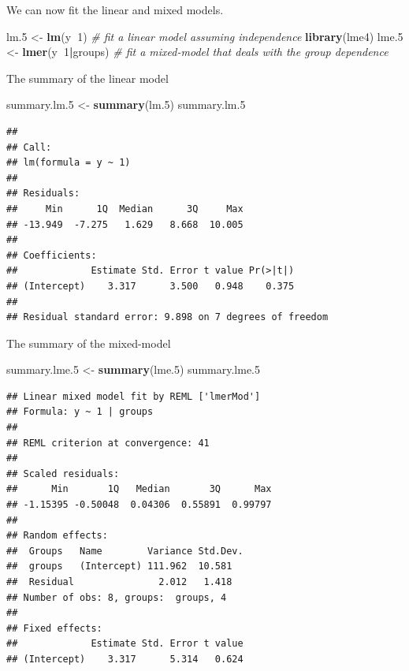 \documentclass[]{book}
\newenvironment{Shaded}{\begin{snugshade}}{\end{snugshade}}
\newcommand{\KeywordTok}[1]{\textcolor[rgb]{0.13,0.29,0.53}{\textbf{#1}}}
\newcommand{\DecValTok}[1]{\textcolor[rgb]{0.00,0.00,0.81}{#1}}
\newcommand{\StringTok}[1]{\textcolor[rgb]{0.31,0.60,0.02}{#1}}
\newcommand{\CommentTok}[1]{\textcolor[rgb]{0.56,0.35,0.01}{\textit{#1}}}
\newcommand{\OperatorTok}[1]{\textcolor[rgb]{0.81,0.36,0.00}{\textbf{#1}}}
\newcommand{\NormalTok}[1]{#1}
\theoremstyle{definition}
\theoremstyle{definition}
\theoremstyle{definition}
\theoremstyle{remark}
\begin{document}
We can now fit the linear and mixed models.

\begin{Shaded}
\begin{Highlighting}[]
\NormalTok{lm.}\DecValTok{5}\NormalTok{ <-}\StringTok{ }\KeywordTok{lm}\NormalTok{(y}\OperatorTok{~}\DecValTok{1}\NormalTok{)  }\CommentTok{# fit a linear model assuming independence}
\KeywordTok{library}\NormalTok{(lme4)}
\NormalTok{lme.}\DecValTok{5}\NormalTok{ <-}\StringTok{ }\KeywordTok{lmer}\NormalTok{(y}\OperatorTok{~}\DecValTok{1}\OperatorTok{|}\NormalTok{groups) }\CommentTok{# fit a mixed-model that deals with the group dependence}
\end{Highlighting}
\end{Shaded}

The summary of the linear model

\begin{Shaded}
\begin{Highlighting}[]
\NormalTok{summary.lm.}\DecValTok{5}\NormalTok{ <-}\StringTok{ }\KeywordTok{summary}\NormalTok{(lm.}\DecValTok{5}\NormalTok{)}
\NormalTok{summary.lm.}\DecValTok{5}
\end{Highlighting}
\end{Shaded}

\begin{verbatim}
## 
## Call:
## lm(formula = y ~ 1)
## 
## Residuals:
##     Min      1Q  Median      3Q     Max 
## -13.949  -7.275   1.629   8.668  10.005 
## 
## Coefficients:
##             Estimate Std. Error t value Pr(>|t|)
## (Intercept)    3.317      3.500   0.948    0.375
## 
## Residual standard error: 9.898 on 7 degrees of freedom
\end{verbatim}

The summary of the mixed-model

\begin{Shaded}
\begin{Highlighting}[]
\NormalTok{summary.lme.}\DecValTok{5}\NormalTok{ <-}\StringTok{ }\KeywordTok{summary}\NormalTok{(lme.}\DecValTok{5}\NormalTok{)}
\NormalTok{summary.lme.}\DecValTok{5}
\end{Highlighting}
\end{Shaded}

\begin{verbatim}
## Linear mixed model fit by REML ['lmerMod']
## Formula: y ~ 1 | groups
## 
## REML criterion at convergence: 41
## 
## Scaled residuals: 
##      Min       1Q   Median       3Q      Max 
## -1.15395 -0.50048  0.04306  0.55891  0.99797 
## 
## Random effects:
##  Groups   Name        Variance Std.Dev.
##  groups   (Intercept) 111.962  10.581  
##  Residual               2.012   1.418  
## Number of obs: 8, groups:  groups, 4
## 
## Fixed effects:
##             Estimate Std. Error t value
## (Intercept)    3.317      5.314   0.624
\end{verbatim}
\end{document}

